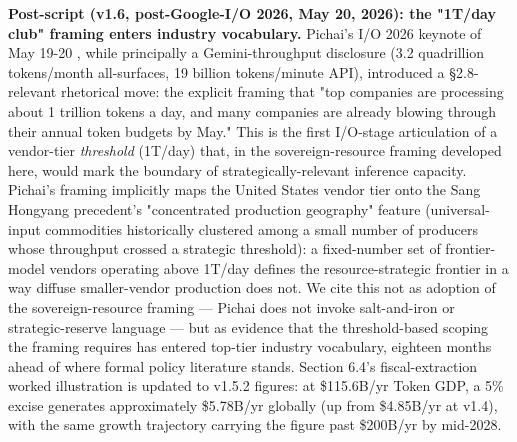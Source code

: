\documentclass[11pt,a4paper]{article}
\begin{document}
\textbf{Post-script (v1.6, post-Google-I/O 2026, May 20, 2026): the "1T/day club" framing enters industry vocabulary.} Pichai's I/O 2026 keynote of May 19-20 \cite{pichai2026io}, while principally a Gemini-throughput disclosure (3.2 quadrillion tokens/month all-surfaces, 19 billion tokens/minute API), introduced a §2.8-relevant rhetorical move: the explicit framing that "top companies are processing about 1 trillion tokens a day, and many companies are already blowing through their annual token budgets by May." This is the first I/O-stage articulation of a vendor-tier \emph{threshold} (1T/day) that, in the sovereign-resource framing developed here, would mark the boundary of strategically-relevant inference capacity. Pichai's framing implicitly maps the United States vendor tier onto the Sang Hongyang precedent's "concentrated production geography" feature (universal-input commodities historically clustered among a small number of producers whose throughput crossed a strategic threshold): a fixed-number set of frontier-model vendors operating above 1T/day defines the resource-strategic frontier in a way diffuse smaller-vendor production does not. We cite this not as adoption of the sovereign-resource framing --- Pichai does not invoke salt-and-iron or strategic-reserve language --- but as evidence that the threshold-based scoping the framing requires has entered top-tier industry vocabulary, eighteen months ahead of where formal policy literature stands. Section 6.4's fiscal-extraction worked illustration is updated to v1.5.2 figures: at \$115.6B/yr Token GDP, a 5\% excise generates approximately \$5.78B/yr globally (up from \$4.85B/yr at v1.4), with the same growth trajectory carrying the figure past \$200B/yr by mid-2028.
\end{document}
